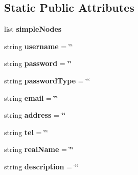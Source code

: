 \subsection*{Static Public Attributes}
\begin{DoxyCompactItemize}
\item 
list {\bfseries simple\-Nodes}
\item 
\hypertarget{classcheshire3_1_1user_1_1_simple_user_acef8e82a8fd1f6cb3e4bdc9e492ffe45}{string {\bfseries username} = \char`\"{}\char`\"{}}\label{classcheshire3_1_1user_1_1_simple_user_acef8e82a8fd1f6cb3e4bdc9e492ffe45}

\item 
\hypertarget{classcheshire3_1_1user_1_1_simple_user_ae26e1bf8cb2cd43266ad5ffb193b3da6}{string {\bfseries password} = \char`\"{}\char`\"{}}\label{classcheshire3_1_1user_1_1_simple_user_ae26e1bf8cb2cd43266ad5ffb193b3da6}

\item 
\hypertarget{classcheshire3_1_1user_1_1_simple_user_a130cd81060e9f8e780ce6fd8d6e0a4ab}{string {\bfseries password\-Type} = \char`\"{}\char`\"{}}\label{classcheshire3_1_1user_1_1_simple_user_a130cd81060e9f8e780ce6fd8d6e0a4ab}

\item 
\hypertarget{classcheshire3_1_1user_1_1_simple_user_a414f67bbd33022bc9e2043a862947409}{string {\bfseries email} = \char`\"{}\char`\"{}}\label{classcheshire3_1_1user_1_1_simple_user_a414f67bbd33022bc9e2043a862947409}

\item 
\hypertarget{classcheshire3_1_1user_1_1_simple_user_a4878579b0c4dc44322a04c5a47ce3215}{string {\bfseries address} = \char`\"{}\char`\"{}}\label{classcheshire3_1_1user_1_1_simple_user_a4878579b0c4dc44322a04c5a47ce3215}

\item 
\hypertarget{classcheshire3_1_1user_1_1_simple_user_a6b9d3a781252a7ef9758b111177ebb81}{string {\bfseries tel} = \char`\"{}\char`\"{}}\label{classcheshire3_1_1user_1_1_simple_user_a6b9d3a781252a7ef9758b111177ebb81}

\item 
\hypertarget{classcheshire3_1_1user_1_1_simple_user_ac0561bba71ed873486237074eccdadaa}{string {\bfseries real\-Name} = \char`\"{}\char`\"{}}\label{classcheshire3_1_1user_1_1_simple_user_ac0561bba71ed873486237074eccdadaa}

\item 
\hypertarget{classcheshire3_1_1user_1_1_simple_user_a171faf4801a4907315d4fe5d99ee4cc9}{string {\bfseries description} = \char`\"{}\char`\"{}}\label{classcheshire3_1_1user_1_1_simple_user_a171faf4801a4907315d4fe5d99ee4cc9}


\end{DoxyCompactItemize}
